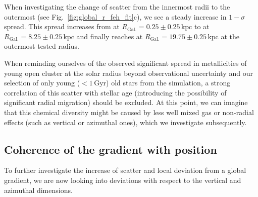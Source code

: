 \documentclass[fleqn,usenatbib]{mnras}
\begin{document}
When investigating the change of scatter from the innermost radii to the outermost (see Fig.~\ref{fig:global_r_feh_fit}c), we see a steady increase in $1-\sigma$ spread. This spread increases from  at $R_\mathrm{Gal.} = 0.25 \pm 0.25\,\mathrm{kpc}$ to  at $R_\mathrm{Gal.} = 8.25 \pm 0.25\,\mathrm{kpc}$ and finally reaches  at $R_\mathrm{Gal.} = 19.75 \pm 0.25\,\mathrm{kpc}$ at the outermost tested radius.

When reminding ourselves of the observed significant spread in metallicities of young open cluster at the solar radius beyond observational uncertainty \citep[e.g.][]{Donor2020, Spina2021} and our selection of only young ($<1\,\mathrm{Gyr}$) old stars from the simulation, a strong correlation of this scatter with stellar age (introducing the possibility of significant radial migration) should be excluded. At this point, we can imagine that this chemical diversity might be caused by less well mixed gas or non-radial effects (such as vertical or azimuthal ones), which we investigate subsequently.

\subsection{Coherence of the gradient with position}
\label{sec:coherence_position_radial_metallicity_gradients}

To further investigate the increase of scatter and local deviation from a global gradient, we are now looking into deviations with respect to the vertical and azimuthal dimensions.
\end{document}
